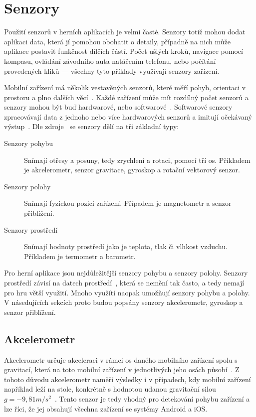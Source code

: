 \section{Senzory}

Použití senzorů v herních aplikacích je velmi časté.
Senzory totiž mohou dodat aplikaci data,
která jí pomohou obohatit o detaily,
případně na nich může aplikace postavit funkčnost dílčích částí.
Počet ušlých kroků,
navigace pomocí kompasu,
ovládání závodního auta natáčením telefonu,
nebo počítání provedených kliků
--- všechny tyto příklady využívají senzory zařízení.~\cite{sensors}

Mobilní zařízení má několik vestavěných senzorů,
které měří pohyb, orientaci v prostoru a plno dalších věcí~\cite{sensors}.
Každé zařízení může mít rozdílný počet senzorů
a senzory mohou být buď hardwarové, nebo softwarové~\cite{sensors}.
Softwarové senzory zpracovávají data z jednoho nebo více hardwarových senzorů
a imitují očekávaný výstup~\cite{sensors}.
Dle zdroje~\cite{sensors} se senzory dělí na tři základní typy:

\begin{description}
    \item[Senzory pohybu] Snímají otřesy a posuny,
    tedy zrychlení a rotaci,
    pomocí tří os.
    Příkladem je akcelerometr, senzor gravitace, gyroskop
    a rotační vektorový senzor.
    \item[Senzory polohy] Snímají fyzickou pozici zařízení.
    Případem je magnetometr a senzor přiblížení.
    \item[Senzory prostředí] Snímají hodnoty prostředí
    jako je teplota, tlak či vlhkost vzduchu.
    Příkladem je termometr a barometr.
\end{description}

Pro herní aplikace jsou nejdůležitější senzory pohybu a senzory polohy.
Senzory prostředí závisí na datech prostředí~\cite{sensors_android},
která se nemění tak často,
a tedy nemají pro hru větší využití.
Mnoho využítí naopak umožňují senzory pohybu a polohy.
V násedujících sekcích proto budou popsány senzory akcelerometr, gyroskop
a senzor přiblížení.

\subsection{Akcelerometr}

Akcelerometr určuje akceleraci v rámci os daného mobilního zařízení
spolu s gravitací,
která na toto mobilní zařízení v jednotlivých jeho osách
působí~\cite{sensors_motion}.
Z tohoto důvodu akcelerometr naměří výsledky i v případech,
kdy mobilní zařízení například leží na stole,
konkrétně s hodnotou udanou
gravitační silou $g = -9,81 m/s^2$~\cite{sensors_motion}.
Tento senzor je tedy vhodný pro detekování pohybu zařízení
a lze říci,
že jej obsahují všechna zařízení se systémy Android a iOS.

